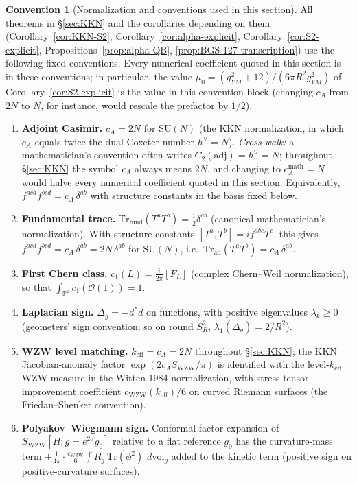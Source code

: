 \documentclass[11pt,letterpaper]{article}
\theoremstyle{definition}
\newtheorem{convention}[theorem]{Convention}
\newcommand{\Tr}{\mathrm{Tr}}
\newcommand{\dvol}{\,d\mathrm{vol}}
\newcommand{\Lap}{\Delta}
\begin{document}
\begin{convention}[Normalization and conventions used in this section]\label{conv:KKN}
All theorems in \S\ref{sec:KKN} and the corollaries depending on them (Corollary~\ref{cor:KKN-S2}, Corollary~\ref{cor:alpha-explicit}, Corollary~\ref{cor:S2-explicit}, Propositions~\ref{prop:alpha-QB}, \ref{prop:BGS-127-transcription}) use the following fixed conventions. Every numerical coefficient quoted in this section is in these conventions; in particular, the value $\mu_0 = (g^2_{YM}+12)/(6\pi R^2 g^2_{YM})$ of Corollary~\ref{cor:S2-explicit} is the value in this convention block (changing $c_A$ from $2N$ to $N$, for instance, would rescale the prefactor by $1/2$).
\begin{enumerate}[label=\textup{(C\arabic*)},leftmargin=2.6em]
\item \textbf{Adjoint Casimir.} $c_A = 2N$ for $\mathrm{SU}(N)$ (the KKN normalization, in which $c_A$ equals twice the dual Coxeter number $h^\vee = N$). \emph{Cross-walk:} a mathematician's convention often writes $C_2(\mathrm{adj}) = h^\vee = N$; throughout \S\ref{sec:KKN} the symbol $c_A$ always means $2N$, and changing to $c_A^{\mathrm{math}} = N$ would halve every numerical coefficient quoted in this section. Equivalently, $f^{acd} f^{bcd} = c_A\,\delta^{ab}$ with structure constants in the basis fixed below.
\item \textbf{Fundamental trace.} $\Tr_{\mathrm{fund}}(T^a T^b) = \tfrac{1}{2}\delta^{ab}$ (canonical mathematician's normalization). With structure constants $[T^a, T^b] = i f^{abc} T^c$, this gives $f^{acd} f^{bcd} = c_A\,\delta^{ab} = 2N\,\delta^{ab}$ for $\mathrm{SU}(N)$, i.e.\ $\Tr_{\mathrm{ad}}(T^a T^b) = c_A\,\delta^{ab}$.
\item \textbf{First Chern class.} $c_1(L) = \tfrac{i}{2\pi}[F_L]$ (complex Chern--Weil normalization), so that $\int_{\mathbb{P}^1} c_1(\mathcal{O}(1)) = 1$.
\item \textbf{Laplacian sign.} $\Lap_g = -d^*d$ on functions, with positive eigenvalues $\lambda_k \ge 0$ (geometers' sign convention; so on round $S^2_R$, $\lambda_1(\Delta_g) = 2/R^2$).
\item \textbf{WZW level matching.} $k_{\mathrm{eff}} = c_A = 2N$ throughout \S\ref{sec:KKN}; the KKN Jacobian-anomaly factor $\exp(2c_A S_{\mathrm{WZW}}/\pi)$ is identified with the level-$k_{\mathrm{eff}}$ WZW measure in the Witten 1984 normalization, with stress-tensor improvement coefficient $c_{\mathrm{WZW}}(k_{\mathrm{eff}})/6$ on curved Riemann surfaces (the Friedan--Shenker convention).
\item \textbf{Polyakov--Wiegmann sign.} Conformal-factor expansion of $S_{\mathrm{WZW}}[H; g = e^{2\sigma} g_0]$ relative to a flat reference $g_0$ has the curvature-mass term $+\tfrac{1}{4\pi}\cdot\tfrac{c_{\mathrm{WZW}}}{6}\int R_g\,\Tr(\phi^2)\,\dvol_g$ added to the kinetic term (positive sign on positive-curvature surfaces).
\end{enumerate}
\end{convention}
\end{document}
